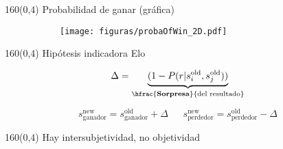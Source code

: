 \documentclass[shownotes,aspectratio=169]{beamer}
\begin{document}
\begin{frame}[plain]
\begin{textblock}{160}(0,4)
\centering  \Large 
Probabilidad de ganar (gr\'afica)
 \end{textblock}
\vspace{0.75cm}
 
\begin{figure}[H]     
     \centering
     \begin{subfigure}[b]{0.55\textwidth}
       \texttt{[image: figuras/probaOfWin\_2D.pdf]} 
     \end{subfigure}
\end{figure}
  
\end{frame}
 
\begin{frame}[plain]
\begin{textblock}{160}(0,4)
\centering \Large
Hipótesis indicadora Elo 
\end{textblock}
\vspace{0.75cm}

\begin{equation*}
 \Delta = \underbrace{(1 - P(r|s_i^{\text{old}},s_j^{\text{old}}))}_{\hfrac{\textbf{Sorpresa}}{\text{del resultado}}}
\end{equation*}

\vspace{0.5cm}

\pause

\begin{equation*}
s_\text{ganador}^{\text{new}} = s_\text{ganador}^{\text{old}} + \Delta \ \ \ \ \ \ \  s_\text{perdedor}^{\text{new}} = s_\text{perdedor}^{\text{old}} - \Delta
\end{equation*}

\pause
\vspace{0.5cm}

\begin{center}
\end{center}


\end{frame}

\begin{frame}[plain]
\begin{textblock}{160}(0,4)
\centering \LARGE Hay intersubjetividad, no objetividad
\end{textblock}
\vspace{0.75cm}
  
 
 
\end{frame}
\end{document}

